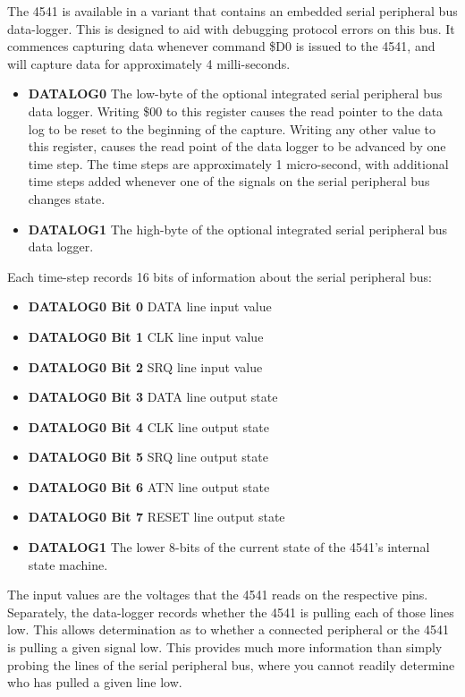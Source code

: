 The 4541 is available in a variant that contains an embedded serial
peripheral bus data-logger. This is designed to aid with debugging
protocol errors on this bus. It commences capturing data whenever
command \$D0 is issued to the 4541, and
will capture data for approximately 4 milli-seconds.

\begin{itemize}
  \item {\bf DATALOG0} The low-byte of the optional integrated serial
    peripheral bus data logger.  Writing \$00 to this register causes
    the read pointer to the data log to be reset to the beginning of
    the capture. Writing any other value to this register, causes the
    read point of the data logger to be advanced by one time step.
    The time steps are approximately 1 micro-second, with additional
    time steps added whenever one of the signals on the serial
    peripheral bus changes state.
    \item {\bf DATALOG1} The high-byte of the optional integrated serial
      peripheral bus data logger.
\end{itemize}

Each time-step records 16 bits of information about the serial
peripheral bus:
\begin{itemize}
\item {\bf DATALOG0 Bit 0} DATA line input value
\item {\bf DATALOG0 Bit 1} CLK line input value
\item {\bf DATALOG0 Bit 2} SRQ line input value
\item {\bf DATALOG0 Bit 3} DATA line output state
\item {\bf DATALOG0 Bit 4} CLK line output state
\item {\bf DATALOG0 Bit 5} SRQ line output state
\item {\bf DATALOG0 Bit 6} ATN line output state
\item {\bf DATALOG0 Bit 7} RESET line output state
\item {\bf DATALOG1} The lower 8-bits of the current state of the 4541's internal state machine.
\end{itemize}

The input values are the voltages that the 4541 reads on the
respective pins.  Separately, the data-logger records whether the 4541
is pulling each of those lines low.  This allows determination as to
whether a connected peripheral or the 4541 is pulling a given signal
low. This provides much more information than simply probing the lines
of the serial peripheral bus, where you cannot readily determine who
has pulled a given line low.

